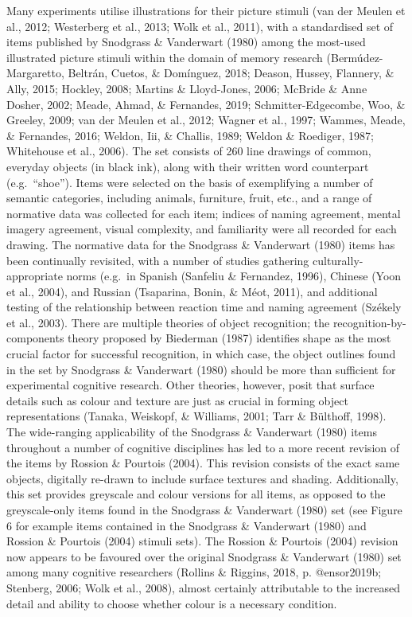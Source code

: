 \documentclass[
  11pt,
]{article}
\begin{document}
Many experiments utilise illustrations for their picture stimuli (van
der Meulen et al., 2012; Westerberg et al., 2013; Wolk et al., 2011),
with a standardised set of items published by Snodgrass \& Vanderwart
(1980) among the most-used illustrated picture stimuli within the domain
of memory research (Bermúdez-Margaretto, Beltrán, Cuetos, \& Domínguez,
2018; Deason, Hussey, Flannery, \& Ally, 2015; Hockley, 2008; Martins \&
Lloyd-Jones, 2006; McBride \& Anne Dosher, 2002; Meade, Ahmad, \&
Fernandes, 2019; Schmitter-Edgecombe, Woo, \& Greeley, 2009; van der
Meulen et al., 2012; Wagner et al., 1997; Wammes, Meade, \& Fernandes,
2016; Weldon, Iii, \& Challis, 1989; Weldon \& Roediger, 1987;
Whitehouse et al., 2006). The set consists of 260 line drawings of
common, everyday objects (in black ink), along with their written word
counterpart (e.g.~``shoe''). Items were selected on the basis of
exemplifying a number of semantic categories, including animals,
furniture, fruit, etc., and a range of normative data was collected for
each item; indices of naming agreement, mental imagery agreement, visual
complexity, and familiarity were all recorded for each drawing. The
normative data for the Snodgrass \& Vanderwart (1980) items has been
continually revisited, with a number of studies gathering
culturally-appropriate norms (e.g.~in Spanish (Sanfeliu \& Fernandez,
1996), Chinese (Yoon et al., 2004), and Russian (Tsaparina, Bonin, \&
Méot, 2011), and additional testing of the relationship between reaction
time and naming agreement (Székely et al., 2003). There are multiple
theories of object recognition; the recognition-by-components theory
proposed by Biederman (1987) identifies shape as the most crucial factor
for successful recognition, in which case, the object outlines found in
the set by Snodgrass \& Vanderwart (1980) should be more than sufficient
for experimental cognitive research. Other theories, however, posit that
surface details such as colour and texture are just as crucial in
forming object representations (Tanaka, Weiskopf, \& Williams, 2001;
Tarr \& Bülthoff, 1998). The wide-ranging applicability of the Snodgrass
\& Vanderwart (1980) items throughout a number of cognitive disciplines
has led to a more recent revision of the items by Rossion \& Pourtois
(2004). This revision consists of the exact same objects, digitally
re-drawn to include surface textures and shading. Additionally, this set
provides greyscale and colour versions for all items, as opposed to the
greyscale-only items found in the Snodgrass \& Vanderwart (1980) set
(see Figure 6 for example items contained in the Snodgrass \& Vanderwart
(1980) and Rossion \& Pourtois (2004) stimuli sets). The Rossion \&
Pourtois (2004) revision now appears to be favoured over the original
Snodgrass \& Vanderwart (1980) set among many cognitive researchers
(Rollins \& Riggins, 2018, p. @ensor2019b; Stenberg, 2006; Wolk et al.,
2008), almost certainly attributable to the increased detail and ability
to choose whether colour is a necessary condition.
\end{document}
